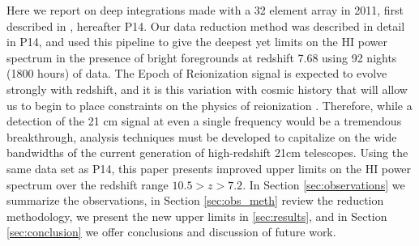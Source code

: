 \documentclass[preprint]{aastex}
\begin{document}
Here we report on deep integrations made with a 32 element array in 2011, first described in \cite{Parsons:2014p10499}, hereafter P14.  Our data reduction method was described in detail in P14, and used this pipeline to give the deepest yet limits on the HI power spectrum in the presence of bright foregrounds at redshift 7.68 using 92 nights (1800 hours) of data.  The Epoch of Reionization signal is expected to evolve strongly with redshift, and it is this variation with cosmic history that will allow us to begin to place constraints on the physics of reionization \citep{Pritchard:2008p8123,Pober:2014p10390}.  Therefore, while a detection of the 21 cm signal at even a single frequency would be a tremendous breakthrough, analysis techniques must be developed to capitalize on the wide bandwidths of the current generation of high-redshift 21cm telescopes.  Using the same data set as P14, this paper presents improved upper limits on the HI power spectrum over the redshift range $10.5>z>7.2$.  In Section  \ref{sec:observations} we summarize the observations, in Section \ref{sec:obs_meth} review the reduction methodology, we present the new upper limits in \ref{sec:results}, and in Section \ref{sec:conclusion} we offer conclusions and discussion of future work.



%


\end{document}

